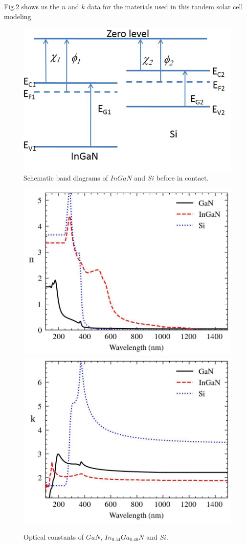 \documentclass[preprint,12pt]{elsarticle}
\begin{document}
Fig.\ref{fig:nk} shows us the $n$ and $k$ data for the materials used in this tandem solar cell modeling.
\begin{figure}[]
	\centering
	\includegraphics[width=0.7\linewidth, height=0.3\textheight]{Figure/Band}
	\caption{Schematic band diagrams of $InGaN$ and $Si$ before in contact.}
	\label{fig:band}
\end{figure}
\begin{figure}[]
	\centering
	\includegraphics[width=0.45\linewidth, height=0.3\textheight]{Figure/fig_n.jpg}
	\includegraphics[width=0.45\linewidth, height=0.3\textheight]{Figure/fig_k.jpg}
	\caption{Optical constants of $GaN$, $In_{0.54}Ga_{0.46}N$ and $Si$.}
	\label{fig:nk}
\end{figure}
\end{document}
